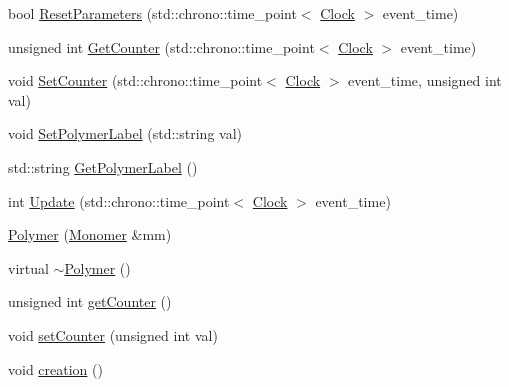 \begin{DoxyCompactItemize}
\item 
bool \mbox{\hyperlink{classPolymer_aa20f1e5c79e8631afa291569d5030103}{Reset\+Parameters}} (std\+::chrono\+::time\+\_\+point$<$ \mbox{\hyperlink{universe_8h_a0ef8d951d1ca5ab3cfaf7ab4c7a6fd80}{Clock}} $>$ event\+\_\+time)
\item 
unsigned int \mbox{\hyperlink{classPolymer_ac33903f9b5d2c73d6ddadcb02ece323e}{Get\+Counter}} (std\+::chrono\+::time\+\_\+point$<$ \mbox{\hyperlink{universe_8h_a0ef8d951d1ca5ab3cfaf7ab4c7a6fd80}{Clock}} $>$ event\+\_\+time)
\item 
void \mbox{\hyperlink{classPolymer_a1500ffc682396af2f4306c7c7ea7fd87}{Set\+Counter}} (std\+::chrono\+::time\+\_\+point$<$ \mbox{\hyperlink{universe_8h_a0ef8d951d1ca5ab3cfaf7ab4c7a6fd80}{Clock}} $>$ event\+\_\+time, unsigned int val)
\item 
void \mbox{\hyperlink{classPolymer_ab96200f701d9e2e63d22bdfd434e5ccb}{Set\+Polymer\+Label}} (std\+::string val)
\item 
std\+::string \mbox{\hyperlink{classPolymer_a80dbc65ac07e20dce3d9a2e9290c5e3b}{Get\+Polymer\+Label}} ()
\item 
int \mbox{\hyperlink{classPolymer_ac82f603c3010212122008c4ed3953045}{Update}} (std\+::chrono\+::time\+\_\+point$<$ \mbox{\hyperlink{universe_8h_a0ef8d951d1ca5ab3cfaf7ab4c7a6fd80}{Clock}} $>$ event\+\_\+time)
\item 
\mbox{\hyperlink{classPolymer_ae77454a3908652e4df6a26b9cac509a5}{Polymer}} (\mbox{\hyperlink{classMonomer}{Monomer}} \&mm)
\item 
virtual \mbox{\hyperlink{classPolymer_aac2b3983f375a5691c7d5ca1a79594d5}{$\sim$\+Polymer}} ()
\item 
unsigned int \mbox{\hyperlink{classPolymer_a8346d821e5f8690d7816ba1d40036b69}{get\+Counter}} ()
\item 
void \mbox{\hyperlink{classPolymer_a7ed6bbe09a570b59f9253d63fd3326d2}{set\+Counter}} (unsigned int val)
\item 
void \mbox{\hyperlink{classPolymer_a1daba3eb2ba8428bf2f3e814668b155f}{creation}} ()
\end{DoxyCompactItemize}
